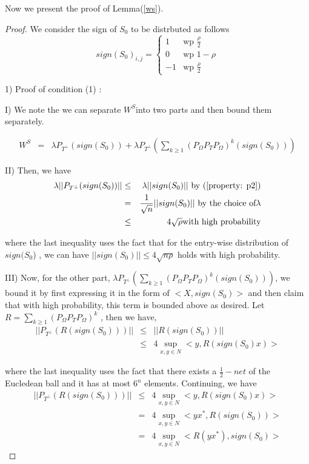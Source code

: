 Now we present the proof of Lemma(\ref{ws}). 
\begin{proof}
We consider the sign of $S_{0}$ to be distrbuted as follows
\[
sign(S_{0})_{i,j}=\begin{cases}
1 & \text{wp }\frac{\rho}{2}\\
0 & \text{wp }1-\rho\\
-1 & \text{wp }\frac{\rho}{2}
\end{cases}
\]


1) Proof of condition (1) :

I) We note the we can separate $W^{S}$into two parts and then bound them separately.

\begin{eqnarray*}
W^{S} & = & \lambda P_{T^{\bot}}(sign(S_{0}))+\lambda P_{T^{\bot}}(\sum_{k\ge1}(P_{\Omega}P_{T}P_{\Omega})^{k}(sign(S_{0})))
\end{eqnarray*}


II) Then, we have
\begin{eqnarray*}
\lambda || P_{T^{\bot}}(sign(S_{0})) || & \le & \lambda||sign(S_{0})|| \text{ by (\ref{property: p2})}\\
 & = & \frac{1}{\sqrt{n}}||sign(S_{0})|| \text{ by the choice of}  \lambda\\
 & \le & 4\sqrt{\rho}\text{with high probability}
\end{eqnarray*}


where the last inequality uses the fact that for the entry-wise distribution of $sign(S_{0}$) , we can have $||sign(S_{0})||\le4\sqrt{n\rho}$ holds with high probability.

III) Now, for the other part, $\lambda P_{T^{\bot}}(\sum_{k\ge1}(P_{\Omega}P_{T}P_{\Omega})^{k}(sign(S_{0})))$, we bound it by first expressing it in the form of $<X,sign(S_{0})>$ and then claim that with high probability, this term is bounded above as desired. Let $R=\sum_{k\ge1}(P_{\Omega}P_{T}P_{\Omega})^{k}$ ,
then we have,
\begin{eqnarray*}
||P_{T^{\bot}}(R(sign(S_{0})))|| & \le & ||R(sign(S_{0}))||\\
 & \le & 4\sup_{x,y\in N}<y,R(sign(S_{0})x)>
\end{eqnarray*}


where the last inequality uses the fact that there exists a $\frac{1}{2}-net$ of the Eucledean ball and it has at most $6^{n}$ elements. Continuing, we have
\begin{eqnarray} 
||P_{T^{\bot}}(R(sign(S_{0})))|| & \le & 4\sup_{x,y\in N}<y,R(sign(S_{0})x)>\\
 & = & 4\sup_{x,y\in N}<yx^{*},R(sign(S_{0}))>\\
 & = & 4\sup_{x,y\in N}<R(yx^{*}),sign(S_{0})>\label{net}
\end{eqnarray}



\end{proof}
